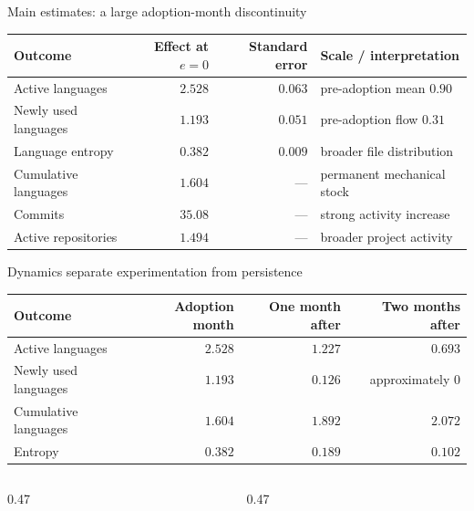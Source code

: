 \documentclass[aspectratio=169,9pt]{beamer}
\begin{document}
\begin{frame}[t]{Main estimates: a large adoption-month discontinuity}
  \vspace{0.34cm}
  \begin{center}
    \renewcommand{\arraystretch}{1.20}
    \begin{tabular}{lrrl}
      \toprule
      Outcome & Effect at $e=0$ & Standard error & Scale / interpretation \\
      \midrule
      Active languages & $2.528$ & $0.063$ & pre-adoption mean $0.90$ \\
      Newly used languages & $1.193$ & $0.051$ & pre-adoption flow $0.31$ \\
      Language entropy & $0.382$ & $0.009$ & broader file distribution \\
      Cumulative languages & $1.604$ & --- & permanent mechanical stock \\
      Commits & $35.08$ & --- & strong activity increase \\
      Active repositories & $1.494$ & --- & broader project activity \\
      \bottomrule
    \end{tabular}
  \end{center}
  \vspace{0.34cm}
\end{frame}

\begin{frame}[t]{Dynamics separate experimentation from persistence}
  \vspace{0.30cm}
  \begin{center}
    \renewcommand{\arraystretch}{1.18}
    \begin{tabular}{lrrr}
      \toprule
      Outcome & Adoption month & One month after & Two months after \\
      \midrule
      Active languages & $2.528$ & $1.227$ & $0.693$ \\
      Newly used languages & $1.193$ & $0.126$ & approximately $0$ \\
      Cumulative languages & $1.604$ & $1.892$ & $2.072$ \\
      Entropy & $0.382$ & $0.189$ & $0.102$ \\
      \bottomrule
    \end{tabular}
  \end{center}
  \vspace{0.30cm}
  \begin{columns}[T,onlytextwidth]
    \begin{column}{0.47\textwidth}
    \end{column}
    \begin{column}{0.47\textwidth}
    \end{column}
  \end{columns}
\end{frame}
\end{document}
